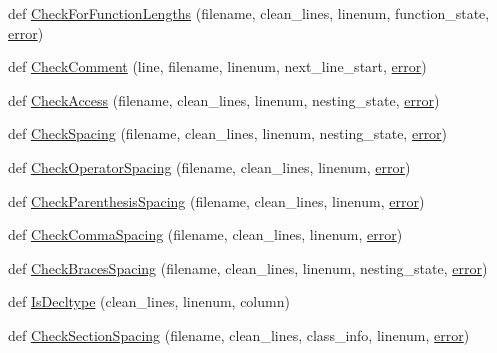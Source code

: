 \begin{DoxyCompactItemize}
\item 
def \hyperlink{namespacecpplint_a2699a7cad55a82cab5f73c012747203e}{Check\+For\+Function\+Lengths} (filename, clean\+\_\+lines, linenum, function\+\_\+state, \hyperlink{_07copy_08_2_read_camera_model_8m_ac546fdc9911f4a876dbfaffbc7426f8b}{error})
\item 
def \hyperlink{namespacecpplint_af126b85f4c25f359c40ce349f4eb7a2d}{Check\+Comment} (line, filename, linenum, next\+\_\+line\+\_\+start, \hyperlink{_07copy_08_2_read_camera_model_8m_ac546fdc9911f4a876dbfaffbc7426f8b}{error})
\item 
def \hyperlink{namespacecpplint_a8459a99cfc020c6dac72b6e93a5c55a7}{Check\+Access} (filename, clean\+\_\+lines, linenum, nesting\+\_\+state, \hyperlink{_07copy_08_2_read_camera_model_8m_ac546fdc9911f4a876dbfaffbc7426f8b}{error})
\item 
def \hyperlink{namespacecpplint_a73e82f51a8d59c816db26b5f797b3431}{Check\+Spacing} (filename, clean\+\_\+lines, linenum, nesting\+\_\+state, \hyperlink{_07copy_08_2_read_camera_model_8m_ac546fdc9911f4a876dbfaffbc7426f8b}{error})
\item 
def \hyperlink{namespacecpplint_a6a15b27f48cfd70fbf76f595c34f6d9e}{Check\+Operator\+Spacing} (filename, clean\+\_\+lines, linenum, \hyperlink{_07copy_08_2_read_camera_model_8m_ac546fdc9911f4a876dbfaffbc7426f8b}{error})
\item 
def \hyperlink{namespacecpplint_aacf5fa793ab27c7038e376d6a4c53d87}{Check\+Parenthesis\+Spacing} (filename, clean\+\_\+lines, linenum, \hyperlink{_07copy_08_2_read_camera_model_8m_ac546fdc9911f4a876dbfaffbc7426f8b}{error})
\item 
def \hyperlink{namespacecpplint_a46d2c48a2d4e747feee44616af987bdf}{Check\+Comma\+Spacing} (filename, clean\+\_\+lines, linenum, \hyperlink{_07copy_08_2_read_camera_model_8m_ac546fdc9911f4a876dbfaffbc7426f8b}{error})
\item 
def \hyperlink{namespacecpplint_a205bb76a59359eb1c0be86567bbc5256}{Check\+Braces\+Spacing} (filename, clean\+\_\+lines, linenum, nesting\+\_\+state, \hyperlink{_07copy_08_2_read_camera_model_8m_ac546fdc9911f4a876dbfaffbc7426f8b}{error})
\item 
def \hyperlink{namespacecpplint_a6e55ab13af2fa8b8e1f50e09aed592b8}{Is\+Decltype} (clean\+\_\+lines, linenum, column)
\item 
def \hyperlink{namespacecpplint_abc4e2f3f48debd6ae3a9561d052a955b}{Check\+Section\+Spacing} (filename, clean\+\_\+lines, class\+\_\+info, linenum, \hyperlink{_07copy_08_2_read_camera_model_8m_ac546fdc9911f4a876dbfaffbc7426f8b}{error})

\end{DoxyCompactItemize}
